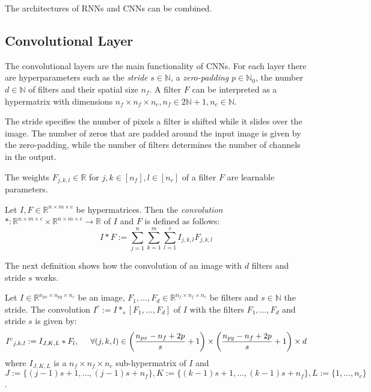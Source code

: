 \documentclass[a4paper, 12pt]{scrreprt} %
\begin{document}
The architectures of \acp{RNN} and \acp{CNN} can be combined.

\subsection{Convolutional Layer}
\label{subsec:CL}
The convolutional layers are the main functionality of \acp{CNN}. For each layer there are hyperparameters such as the \emph{stride} $s \in \mathbb{N}$, a \emph{zero-padding} $p \in \mathbb{N}_0$, the number $d\in \mathbb{N}$ of  filters and their spatial size $n_f$. A filter $F$ can be interpreted as a hypermatrix with dimensions $n_f \times n_f \times n_c, n_f \in 2\mathbb{N}+1, n_c \in \mathbb{N}$. 

The stride specifies the number of pixels a filter is shifted while it slides over the image. The number of zeros that are padded around the input image is given by the zero-padding, while the number of filters determines the number of channels in the output.

The weights $F_{j,k,l} \in \mathbb{R} $ for $j,k \in [n_f], l \in [n_c]$ of a filter $F$ are learnable parameters.\newline

\begin{definition}[Convolution]
Let $I,F \in \mathbb{R}^{n\times m \times c}$  be hypermatrices. Then the \emph{convolution} $*:\mathbb{R}^{n\times m \times c}\times \mathbb{R}^{n\times m \times c} \to \mathbb{R}$ of $I$ and $F$ is defined as follows:
\begin{equation*}
I*F := \sum\limits_{j=1}^{n} \sum\limits_{k=1}^{m} \sum\limits_{l=1}^{c} I_{j,k,l}F_{j,k,l}
\end{equation*}
\end{definition}

The next definition shows how the convolution of an image with $d$ filters and stride $s$ works.
\begin{definition}
Let $I \in \mathbb{R}^{n_{px} \times n_{py} \times n_c}$ be an image, $F_1,\dots, F_d \in \mathbb{R}^{n_f \times n_f \times n_c}$ be  filters and $s \in \mathbb{N}$ the stride. The convolution $I^c := I *_s [F_1, \dots, F_d]$ of $I$ with the filters $F_1,\dots, F_d$ and stride $s$ is given by: 
\begin{equation*}
{I^c}_{j,k,l} := I_{J,K,L} * F_l, \hspace{0.5cm}\forall (j,k,l) \in \left(\frac{n_{px}-n_f+2p}{s}+1\right)\times \left(\frac{n_{py}-n_f+2p}{s}+1\right)  \times d
\end{equation*}
where $I_{J,K,L}$ is a $n_f \times n_f \times n_c$ sub-hypermatrix of $I$ and $J:=\{(j-1)s+1,\dots,(j-1)s+n_f\}, K:=\{(k-1)s+1,\dots,(k-1)s+n_f\}, L:=\{1, \dots, n_c\}$.
\end{definition}
\end{document}
